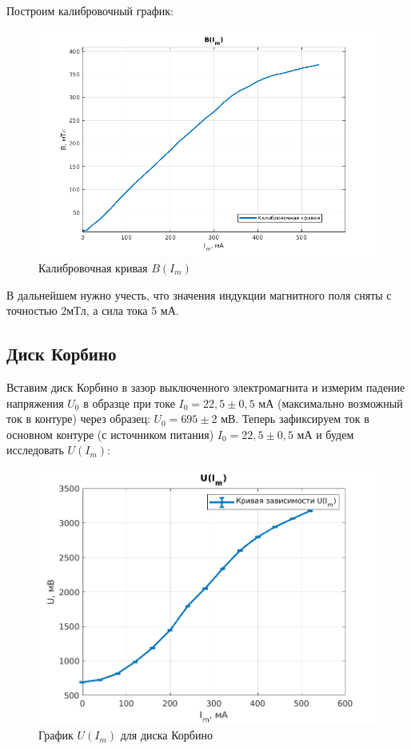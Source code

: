 Построим калибровочный график:

\begin{figure}[h!]
    \centering
    \includegraphics[width = 13 cm]{images/kalibr.png}
    \caption{Калибровочная кривая $B(I_m)$}
    \label{kalib}
\end{figure}

В дальнейшем нужно учесть, что значения индукции магнитного поля сняты с точностью $2 мТл$, а сила тока $5$ мА.

\subsection{Диск Корбино}

Вставим диск Корбино в зазор выключенного электромагнита и измерим падение напряжения $U_0$ в образце при токе $I_0 = 22,5 \pm 0,5$ мА (максимально возможный ток в контуре) через образец: $U_0 = 695 \pm 2$ мВ. Теперь зафиксируем ток в основном контуре (с источником питания) $I_0 = 22,5 \pm 0,5$ мА и будем исследовать $U(I_m)$:

\begin{figure}[h!]
    \centering
    \includegraphics[width = 11 cm]{images/UIM.png}
    \caption{График $U(I_m)$ для диска Корбино}
    \label{uim}
\end{figure}

